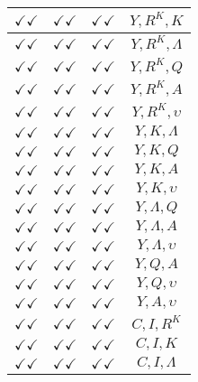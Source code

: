 \documentclass[a4paper,10pt]{article}
\begin{document}
\begin{longtable}{|c|c|c|c|}
\hline
$\checkmark\checkmark$ & $\checkmark\checkmark$ & $\checkmark\checkmark$ & ${Y},{R^{K}},{K}$ \\
\hline
$\checkmark\checkmark$ & $\checkmark\checkmark$ & $\checkmark\checkmark$ & ${Y},{R^{K}},{\Lambda}$ \\
\hline
$\checkmark\checkmark$ & $\checkmark\checkmark$ & $\checkmark\checkmark$ & ${Y},{R^{K}},{Q}$ \\
\hline
$\checkmark\checkmark$ & $\checkmark\checkmark$ & $\checkmark\checkmark$ & ${Y},{R^{K}},{A}$ \\
\hline
$\checkmark\checkmark$ & $\checkmark\checkmark$ & $\checkmark\checkmark$ & ${Y},{R^{K}},{\upsilon}$ \\
\hline
$\checkmark\checkmark$ & $\checkmark\checkmark$ & $\checkmark\checkmark$ & ${Y},{K},{\Lambda}$ \\
\hline
$\checkmark\checkmark$ & $\checkmark\checkmark$ & $\checkmark\checkmark$ & ${Y},{K},{Q}$ \\
\hline
$\checkmark\checkmark$ & $\checkmark\checkmark$ & $\checkmark\checkmark$ & ${Y},{K},{A}$ \\
\hline
$\checkmark\checkmark$ & $\checkmark\checkmark$ & $\checkmark\checkmark$ & ${Y},{K},{\upsilon}$ \\
\hline
$\checkmark\checkmark$ & $\checkmark\checkmark$ & $\checkmark\checkmark$ & ${Y},{\Lambda},{Q}$ \\
\hline
$\checkmark\checkmark$ & $\checkmark\checkmark$ & $\checkmark\checkmark$ & ${Y},{\Lambda},{A}$ \\
\hline
$\checkmark\checkmark$ & $\checkmark\checkmark$ & $\checkmark\checkmark$ & ${Y},{\Lambda},{\upsilon}$ \\
\hline
$\checkmark\checkmark$ & $\checkmark\checkmark$ & $\checkmark\checkmark$ & ${Y},{Q},{A}$ \\
\hline
$\checkmark\checkmark$ & $\checkmark\checkmark$ & $\checkmark\checkmark$ & ${Y},{Q},{\upsilon}$ \\
\hline
$\checkmark\checkmark$ & $\checkmark\checkmark$ & $\checkmark\checkmark$ & ${Y},{A},{\upsilon}$ \\
\hline
$\checkmark\checkmark$ & $\checkmark\checkmark$ & $\checkmark\checkmark$ & ${C},{I},{R^{K}}$ \\
\hline
$\checkmark\checkmark$ & $\checkmark\checkmark$ & $\checkmark\checkmark$ & ${C},{I},{K}$ \\
\hline
$\checkmark\checkmark$ & $\checkmark\checkmark$ & $\checkmark\checkmark$ & ${C},{I},{\Lambda}$ \\
\hline

\end{longtable}
\end{document}
